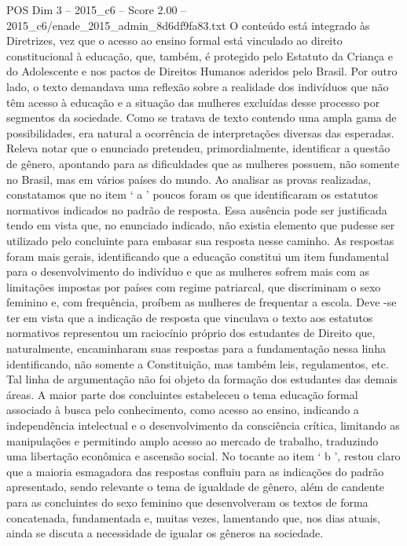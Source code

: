 \begin{textsample}{POS Dim 3 – 2015\_c6 – Score 2.00 – 2015\_c6/enade\_2015\_admin\_8d6df9fa83.txt}
O conteúdo está integrado às Diretrizes, vez que o acesso ao ensino formal está vinculado ao direito constitucional à educação, que, também, é protegido pelo Estatuto da Criança e do Adolescente e nos pactos de Direitos Humanos aderidos pelo Brasil.
Por outro lado, o texto demandava uma reflexão sobre a realidade dos indivíduos que não têm acesso à educação e a situação das mulheres excluídas desse processo por segmentos da sociedade.
Como se tratava de texto contendo uma ampla gama de possibilidades, era natural a ocorrência de interpretações diversas das esperadas.
Releva notar que o enunciado pretendeu, primordialmente, identificar a questão de gênero, apontando para as dificuldades que as mulheres possuem, não somente no Brasil, mas em vários países do mundo.
Ao analisar as provas realizadas, constatamos que no item ‘ a ’ poucos foram os que identificaram os estatutos normativos indicados no padrão de resposta.
Essa ausência pode ser justificada tendo em vista que, no enunciado indicado, não existia elemento que pudesse ser utilizado pelo concluinte para embasar sua resposta nesse caminho.
As respostas foram mais gerais, identificando que a educação constitui um item fundamental para o desenvolvimento do indivíduo e que as mulheres sofrem mais com as limitações impostas por países com regime patriarcal, que discriminam o sexo feminino e, com frequência, proíbem as mulheres de frequentar a escola.
Deve -se ter em vista que a indicação de resposta que vinculava o texto aos estatutos normativos representou um raciocínio próprio dos estudantes de Direito que, naturalmente, encaminharam suas respostas para a fundamentação nessa linha identificando, não somente a Constituição, mas também leis, regulamentos, etc.
Tal linha de argumentação não foi objeto da formação dos estudantes das demais áreas.
A maior parte dos concluintes estabeleceu o tema educação formal associado à busca pelo conhecimento, como acesso ao ensino, indicando a independência intelectual e o desenvolvimento da consciência crítica, limitando as manipulações e permitindo amplo acesso ao mercado de trabalho, traduzindo uma libertação econômica e ascensão social.
No tocante ao item ‘ b ’, restou claro que a maioria esmagadora das respostas confluiu para as indicações do padrão apresentado, sendo relevante o tema de igualdade de gênero, além de candente para as concluintes do sexo feminino que desenvolveram os textos de forma concatenada, fundamentada e, muitas vezes, lamentando que, nos dias atuais, ainda se discuta a necessidade de igualar os gêneros na sociedade.

\end{textsample}
